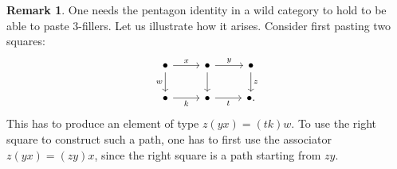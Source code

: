 \documentclass{amsart}
\theoremstyle{definition}
\newtheorem{re}[theorem]{Remark}
\begin{document}
\begin{re}\label{re:pentagon}
    One needs the pentagon identity in a wild category to hold to be able to paste 3-fillers. Let us illustrate how it arises. Consider first pasting two squares:
    \[\begin{tikzcd}
    	\bullet & \bullet & \bullet \\
    	\bullet & \bullet & {\bullet.}
    	\arrow["x", from=1-1, to=1-2]
    	\arrow["w"', from=1-1, to=2-1]
    	\arrow["y", from=1-2, to=1-3]
    	\arrow[from=1-2, to=2-2]
    	\arrow["z", from=1-3, to=2-3]
    	\arrow["k"', from=2-1, to=2-2]
    	\arrow["t"', from=2-2, to=2-3]
    \end{tikzcd}\]
    This has to produce an element of type $z(yx) = (tk)w$. To use the right square to construct such a path, one has to first use the associator $z(yx) = (zy)x$, since the right square is a path starting from $zy$.


\end{re}
\end{document}
